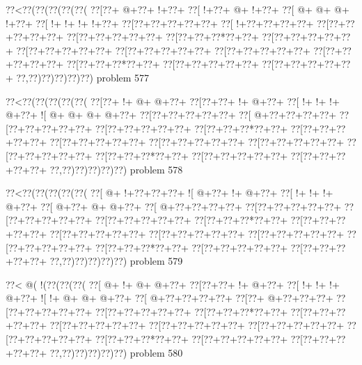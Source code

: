 \vbox{\vbox{\goo
\0??<\0??(\0??(\0??(\0??(\0??(
\0??[\0??+\- @+\0??+\- !+\0??+
\0??[\- !+\0??+\- @+\- !+\0??+
\0??[\- @+\- @+\- @+\- !+\0??+
\0??[\- !+\- !+\- !+\- !+\0??+
\0??[\0??+\0??+\0??+\0??+\0??+
\0??[\- !+\0??+\0??+\0??+\0??+
\0??[\0??+\0??+\0??+\0??+\0??+
\0??[\0??+\0??+\0??+\0??+\0??+
\0??[\0??+\0??+\0??*\0??+\0??+
\0??[\0??+\0??+\0??+\0??+\0??+
\0??[\0??+\0??+\0??+\0??+\0??+
\0??[\0??+\0??+\0??+\0??+\0??+
\0??[\0??+\0??+\0??+\0??+\0??+
\0??[\0??+\0??+\0??+\0??+\0??+
\0??[\0??+\0??+\0??*\0??+\0??+
\0??[\0??+\0??+\0??+\0??+\0??+
\0??[\0??+\0??+\0??+\0??+\0??+
\0??,\0??)\0??)\0??)\0??)\0??)
}
\hfil problem 577\hfil\break
}

\vbox{\vbox{\goo
\0??<\0??(\0??(\0??(\0??(\0??(
\0??[\0??+\- !+\- @+\- @+\0??+
\0??[\0??+\0??+\- !+\- @+\0??+
\0??[\- !+\- !+\- !+\- @+\0??+
\- ![\- @+\- @+\- @+\- @+\0??+
\0??[\0??+\0??+\0??+\0??+\0??+
\0??[\- @+\0??+\0??+\0??+\0??+
\0??[\0??+\0??+\0??+\0??+\0??+
\0??[\0??+\0??+\0??+\0??+\0??+
\0??[\0??+\0??+\0??*\0??+\0??+
\0??[\0??+\0??+\0??+\0??+\0??+
\0??[\0??+\0??+\0??+\0??+\0??+
\0??[\0??+\0??+\0??+\0??+\0??+
\0??[\0??+\0??+\0??+\0??+\0??+
\0??[\0??+\0??+\0??+\0??+\0??+
\0??[\0??+\0??+\0??*\0??+\0??+
\0??[\0??+\0??+\0??+\0??+\0??+
\0??[\0??+\0??+\0??+\0??+\0??+
\0??,\0??)\0??)\0??)\0??)\0??)
}
\hfil problem 578\hfil\break
}

\vbox{\vbox{\goo
\0??<\0??(\0??(\0??(\0??(\0??(
\0??[\- @+\- !+\0??+\0??+\0??+
\- ![\- @+\0??+\- !+\- @+\0??+
\0??[\- !+\- !+\- !+\- @+\0??+
\0??[\- @+\0??+\- @+\- @+\0??+
\0??[\- @+\0??+\0??+\0??+\0??+
\0??[\0??+\0??+\0??+\0??+\0??+
\0??[\0??+\0??+\0??+\0??+\0??+
\0??[\0??+\0??+\0??+\0??+\0??+
\0??[\0??+\0??+\0??*\0??+\0??+
\0??[\0??+\0??+\0??+\0??+\0??+
\0??[\0??+\0??+\0??+\0??+\0??+
\0??[\0??+\0??+\0??+\0??+\0??+
\0??[\0??+\0??+\0??+\0??+\0??+
\0??[\0??+\0??+\0??+\0??+\0??+
\0??[\0??+\0??+\0??*\0??+\0??+
\0??[\0??+\0??+\0??+\0??+\0??+
\0??[\0??+\0??+\0??+\0??+\0??+
\0??,\0??)\0??)\0??)\0??)\0??)
}
\hfil problem 579\hfil\break
}

\vbox{\vbox{\goo
\0??<\- @(\- !(\0??(\0??(\0??(
\0??[\- @+\- !+\- @+\- @+\0??+
\0??[\0??+\0??+\- !+\- @+\0??+
\0??[\- !+\- !+\- !+\- @+\0??+
\- ![\- !+\- @+\- @+\- @+\0??+
\0??[\- @+\0??+\0??+\0??+\0??+
\0??[\0??+\- @+\0??+\0??+\0??+
\0??[\0??+\0??+\0??+\0??+\0??+
\0??[\0??+\0??+\0??+\0??+\0??+
\0??[\0??+\0??+\0??*\0??+\0??+
\0??[\0??+\0??+\0??+\0??+\0??+
\0??[\0??+\0??+\0??+\0??+\0??+
\0??[\0??+\0??+\0??+\0??+\0??+
\0??[\0??+\0??+\0??+\0??+\0??+
\0??[\0??+\0??+\0??+\0??+\0??+
\0??[\0??+\0??+\0??*\0??+\0??+
\0??[\0??+\0??+\0??+\0??+\0??+
\0??[\0??+\0??+\0??+\0??+\0??+
\0??,\0??)\0??)\0??)\0??)\0??)
}
\hfil problem 580\hfil\break
}


